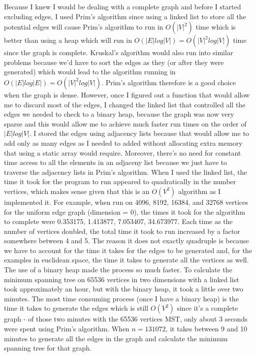 \documentclass{article}
\begin{document}
Because I knew I would be dealing with a complete graph and before I started excluding edges, I used Prim's algorithm since using a linked list to store all the potential edges will cause Prim's algorithm to run in $O(|V|^2)$ time which is better than using a heap which will run in $O(|E|log|V|) = O(|V|^2log|V|)$ time since the graph is complete.  Kruskal's algorithm would also run into similar problems because we'd have to sort the edges as they (or after they were generated) which would lead to the algorithm running in $O(|E|log|E|) = O(|V|^2log|V|)$.  Prim's algorithm therefore is a good choice when the graph is dense.  However, once I figured out a function that would allow me to discard most of the edges, I changed the linked list that controlled all the edges we needed to check to a binary heap, because the graph was now very sparse and this would allow me to achieve much faster run times on the order of $|E|log|V|$.  I stored the edges using adjacency lists because that would allow me to add only as many edges as I needed to added without allocating extra memory that using a static array would require. Moreover, there's no need for constant time access to all the elements in an adjaceny list because we just have to traverse the adjacency lists in Prim's algorithm.  When I used the linked list, the time it took for the program to run appeared to quadratically in the number vertices, which makes sense given that this is an $O(V^2)$ algorithm as I implemented it.  For example, when run on 4096, 8192, 16384, and 32768 vertices for the uniform edge graph (dimension = 0), the times it took for the algorithm to complete were 0.353175, 1.413877, 7.053407, 34.673977.  Each time as the number of vertices doubled, the total time it took to run increased by a factor somewhere between 4 and 5.  The reason it does not exactly quadruple is because we have to account for the time it takes for the edges to be generated and, for the examples in euclidean space, the time it takes to generate all the vertices as well.  The use of a binary heap made the process so much faster.  To calculate the minimum spanning tree on 65536 vertices in two dimensions with a linked list took approximately an hour, but with the binary heap, it took a little over two minutes. The most time consuming process (once I have a binary heap) is the time it takes to generate the edges which is still $O(V^2)$ since it's a complete graph - of those two minutes with the 65536 vertices MST, only about 3 seconds were spent using Prim's algorithm.  When $n=131072$, it takes between 9 and 10 minutes to generate all the edges in the graph and calculate the minimum spanning tree for that graph. \\\\ 
\end{document}
